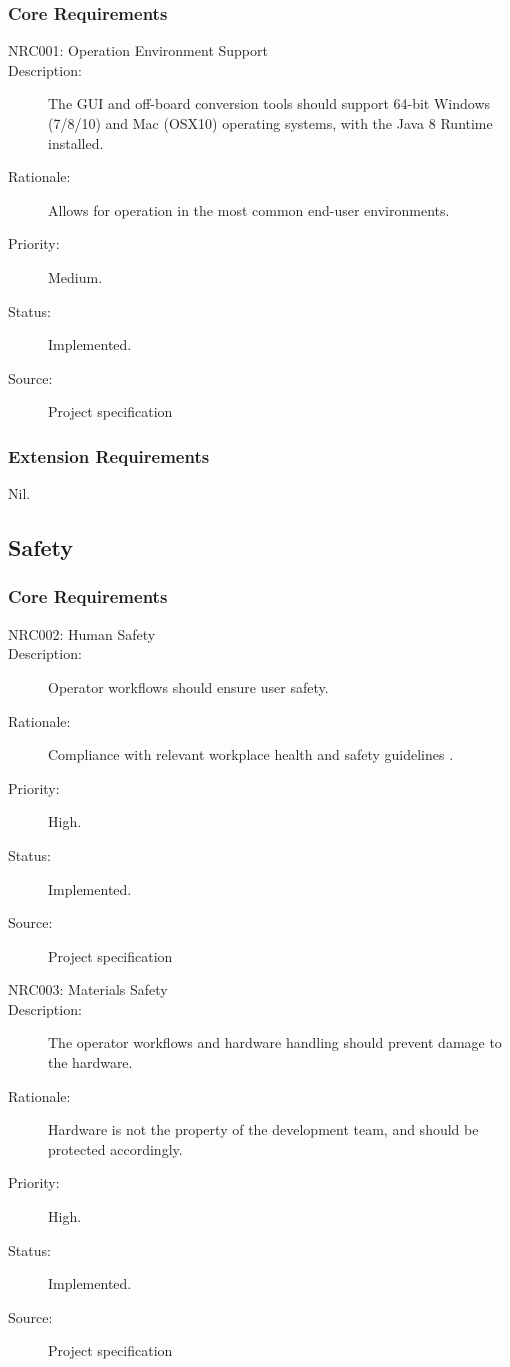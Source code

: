 \documentclass[12pt]{article}
\begin{document}
\subsubsection{Core Requirements}
\begin{description}
\item [{NRC001: Operation Environment Support}] 
\item [{Description: }\label{Description}] The GUI and off-board conversion tools should support 64-bit Windows (7/8/10) and Mac (OSX10) operating systems, with the Java 8 Runtime installed.
\item[{Rationale: }\label{Rationale}] Allows for operation in the most common end-user environments.
\item[{Priority: }\label{Priority}] Medium.
\item[{Status: }\label{Status}] Implemented.
\item[{Source: }\label{Source}] Project specification \cite{spec}

\end{description}

\subsubsection{Extension Requirements}
Nil.

\subsection{Safety}
\subsubsection{Core Requirements}
\begin{description}
\item [{NRC002: Human Safety}] 
\item [{Description: }\label{Description}] Operator workflows should ensure user safety.
\item[{Rationale: }\label{Rationale}] Compliance with relevant workplace health and safety guidelines \cite{whs}.
\item[{Priority: }\label{Priority}] High.
\item[{Status: }\label{Status}] Implemented.
\item[{Source: }\label{Source}] Project specification \cite{spec}

\item [{NRC003: Materials Safety}] 
\item [{Description: }\label{Description}] The operator workflows and hardware handling should prevent damage to the hardware.
\item[{Rationale: }\label{Rationale}] Hardware is not the property of the development team, and should be protected accordingly.
\item[{Priority: }\label{Priority}] High.
\item[{Status: }\label{Status}] Implemented.
\item[{Source: }\label{Source}] Project specification \cite{spec}
\end{description}
\end{document}
